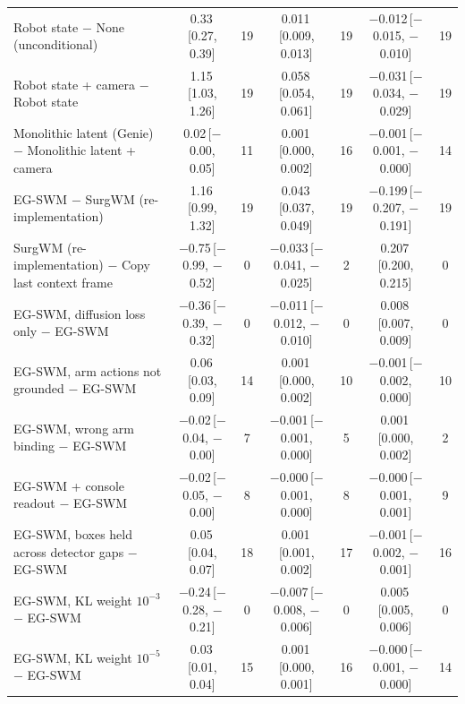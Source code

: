 \begin{tabular}{lcccccc}
Robot state $-$ None (unconditional) & 0.33\,{\scriptsize[0.27, 0.39]} & 19 & 0.011\,{\scriptsize[0.009, 0.013]} & 19 & $-$0.012\,{\scriptsize[$-$0.015, $-$0.010]} & 19 \\
Robot state + camera $-$ Robot state & 1.15\,{\scriptsize[1.03, 1.26]} & 19 & 0.058\,{\scriptsize[0.054, 0.061]} & 19 & $-$0.031\,{\scriptsize[$-$0.034, $-$0.029]} & 19 \\
Monolithic latent (Genie) $-$ Monolithic latent + camera & 0.02\,{\scriptsize[$-$0.00, 0.05]} & 11 & 0.001\,{\scriptsize[0.000, 0.002]} & 16 & $-$0.001\,{\scriptsize[$-$0.001, $-$0.000]} & 14 \\
EG-SWM $-$ SurgWM (re-implementation) & 1.16\,{\scriptsize[0.99, 1.32]} & 19 & 0.043\,{\scriptsize[0.037, 0.049]} & 19 & $-$0.199\,{\scriptsize[$-$0.207, $-$0.191]} & 19 \\
SurgWM (re-implementation) $-$ Copy last context frame & $-$0.75\,{\scriptsize[$-$0.99, $-$0.52]} & 0 & $-$0.033\,{\scriptsize[$-$0.041, $-$0.025]} & 2 & 0.207\,{\scriptsize[0.200, 0.215]} & 0 \\
EG-SWM, diffusion loss only $-$ EG-SWM & $-$0.36\,{\scriptsize[$-$0.39, $-$0.32]} & 0 & $-$0.011\,{\scriptsize[$-$0.012, $-$0.010]} & 0 & 0.008\,{\scriptsize[0.007, 0.009]} & 0 \\
EG-SWM, arm actions not grounded $-$ EG-SWM & 0.06\,{\scriptsize[0.03, 0.09]} & 14 & 0.001\,{\scriptsize[0.000, 0.002]} & 10 & $-$0.001\,{\scriptsize[$-$0.002, 0.000]} & 10 \\
EG-SWM, wrong arm binding $-$ EG-SWM & $-$0.02\,{\scriptsize[$-$0.04, $-$0.00]} & 7 & $-$0.001\,{\scriptsize[$-$0.001, 0.000]} & 5 & 0.001\,{\scriptsize[0.000, 0.002]} & 2 \\
EG-SWM + console readout $-$ EG-SWM & $-$0.02\,{\scriptsize[$-$0.05, $-$0.00]} & 8 & $-$0.000\,{\scriptsize[$-$0.001, 0.000]} & 8 & $-$0.000\,{\scriptsize[$-$0.001, 0.001]} & 9 \\
EG-SWM, boxes held across detector gaps $-$ EG-SWM & 0.05\,{\scriptsize[0.04, 0.07]} & 18 & 0.001\,{\scriptsize[0.001, 0.002]} & 17 & $-$0.001\,{\scriptsize[$-$0.002, $-$0.001]} & 16 \\
EG-SWM, KL weight $10^{-3}$ $-$ EG-SWM & $-$0.24\,{\scriptsize[$-$0.28, $-$0.21]} & 0 & $-$0.007\,{\scriptsize[$-$0.008, $-$0.006]} & 0 & 0.005\,{\scriptsize[0.005, 0.006]} & 0 \\
EG-SWM, KL weight $10^{-5}$ $-$ EG-SWM & 0.03\,{\scriptsize[0.01, 0.04]} & 15 & 0.001\,{\scriptsize[0.000, 0.001]} & 16 & $-$0.000\,{\scriptsize[$-$0.001, $-$0.000]} & 14 \\

\end{tabular}

